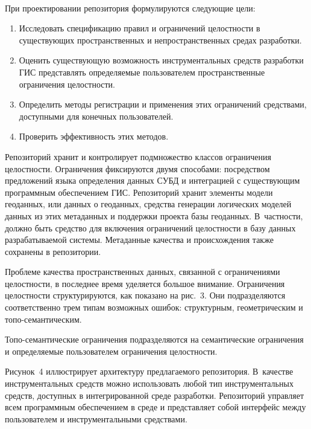 \begin{multicols}{2}
\begin{figure*}[b] %
 \vspace*{1pt}
 \begin{center}
 \mbox{%
 \epsfxsize=101.181mm
 }
 \end{center}
 \vspace*{-9pt}
\end{figure*}


      При проектировании репозитория формулируются следующие цели:
      \begin{enumerate}[1.]
\item Исследовать спецификацию правил и ограничений целостности в существующих 
пространственных и непространственных средах разработки.
\item Оценить существующую возможность инструментальных средств разработки ГИС 
пред\-став\-лять определяемые пользователем пространственные ограничения целостности.
\item Определить методы регистрации и применения этих ограничений средствами, 
доступными для конечных пользователей.
\item Проверить эффективность этих методов.
      \end{enumerate}
      
      Репозиторий хранит и контролирует подмножество классов ограничения 
целостности. Ограничения фиксируются двумя способами: посредством предложений 
языка определения данных СУБД и интеграцией с существующим программным 
обеспечением ГИС. Репозиторий хранит элементы модели геоданных, или данных о 
геоданных, средства генерации логических моделей данных из этих метаданных и 
поддержки проекта базы геоданных. В~частности, должно быть средство для включения 
ограничений целостности в базу данных разрабатываемой системы. Метаданные качества 
и происхождения также сохранены в репозитории. 
      
      Проблеме качества пространственных данных, связанной с ограничениями 
целостности, в последнее время уделяется большое внимание. Ограничения целостности 
структурируются, как показано на рис.~3. Они подразделяются соответственно трем типам 
возможных ошибок: структурным, гео\-мет\-рическим и 
      то\-по-се\-ман\-ти\-че\-ским. 
      
      То\-по-се\-ман\-ти\-че\-ские ограничения подразделяются 
на семантические ограничения и опреде\-ля\-емые пользователем ограничения целостности. 

      Рисунок~4 иллюстрирует архитектуру предлагаемого репозитория. В~качестве 
инструментальных средств можно использовать любой тип инструментальных средств, 
доступных в интегрированной среде разработки. Репозиторий управляет всем 
программным обеспечением в среде и представляет собой интерфейс между 
пользователем и инструментальными средствами. 


\end{multicols}
